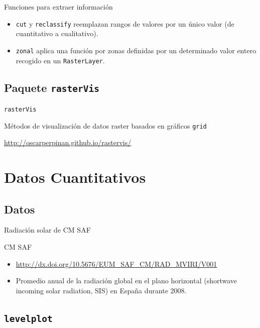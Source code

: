 \documentclass[xcolor={usenames,svgnames,dvipsnames}]{beamer}
\begin{document}
\begin{frame}[fragile,label=sec-1-2-6]{Funciones para extraer información}
 \begin{itemize}
\item \texttt{cut} y \texttt{reclassify} reemplazan rangos de valores por un único valor (de cuantitativo a cualitativo).
\item \texttt{zonal} aplica una función por zonas definidas por un determinado valor entero recogido en un \texttt{RasterLayer}.
\end{itemize}
\end{frame}
\subsection{Paquete \texttt{rasterVis}}
\label{sec-1-3}
\begin{frame}[fragile,label=sec-1-3-1]{\texttt{rasterVis}}
 \begin{block}{Métodos de visualización de datos raster basados en gráficos \texttt{grid}}
\end{block}
\begin{block}{\url{http://oscarperpinan.github.io/rastervis/}}
\end{block}
\end{frame}


\section{Datos Cuantitativos}
\label{sec-2}

\subsection{Datos}
\label{sec-2-1}

\begin{frame}[label=sec-2-1-1]{Radiación solar de CM SAF}
\begin{block}{CM SAF}
\begin{itemize}
\item \url{http://dx.doi.org/10.5676/EUM_SAF_CM/RAD_MVIRI/V001}
\item Promedio anual de la radiación global en el plano horizontal
(shortwave incoming solar radiation, SIS) en España durante 2008.
\end{itemize}
\end{block}
\end{frame}

\subsection{\texttt{levelplot}}
\label{sec-2-2}
\end{document}
